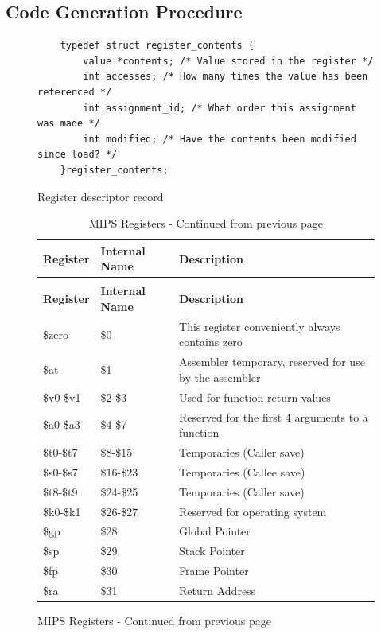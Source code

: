 \subsection{Code Generation Procedure}



\begin{figure}[p]
	\begin{verbatim}
	typedef struct register_contents {
	    value *contents; /* Value stored in the register */
	    int accesses; /* How many times the value has been referenced */
	    int assignment_id; /* What order this assignment was made */
	    int modified; /* Have the contents been modified since load? */
	}register_contents;
	\end{verbatim}
	\caption{Register descriptor record}
	\label{fig:descriptor}
\end{figure}

\begin{figure}[p]
	\begin{longtable}{|p{3cm}|p{3cm}|p{9cm}|}
		\caption[]{MIPS Registers \label{table:registers}}\\	
		\hline \textbf{Register} & \textbf{Internal Name} & \textbf{Description} \\ \hline
		\endfirsthead
		\caption[]{MIPS Registers - Continued from previous page}\\	
		\hline \textbf{Register} & \textbf{Internal Name} & \textbf{Description} \\ \hline
		\endhead
		\$zero & \$0 & This register conveniently always contains zero \\ \hline
		\$at & \$1 & Assembler temporary, reserved for use by the assembler \\ \hline	
		\$v0-\$v1 & \$2-\$3 & Used for function return values \\ \hline	
		\$a0-\$a3 & \$4-\$7 & Reserved for the first 4 arguments to a function \\ \hline	
		\$t0-\$t7 & \$8-\$15 & Temporaries (Caller save) \\ \hline	
		\$s0-\$s7 & \$16-\$23 & Temporaries (Callee save) \\ \hline	
		\$t8-\$t9 & \$24-\$25 & Temporaries (Caller save) \\ \hline		
		\$k0-\$k1 & \$26-\$27 & Reserved for operating system \\ \hline			
		\$gp & \$28 & Global Pointer \\ \hline					
		\$sp & \$29 & Stack Pointer \\ \hline					
		\$fp & \$30 & Frame Pointer \\ \hline					
		\$ra & \$31 & Return Address \\ \hline								
	\end{longtable}
\end{figure}

